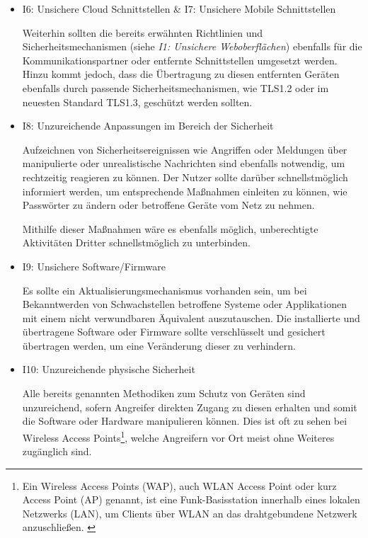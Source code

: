 \begin{itemize}
            \item I6: Unsichere Cloud Schnittstellen \& I7: Unsichere Mobile Schnittstellen
            
            Weiterhin sollten die bereits erwähnten Richtlinien und Sicherheitsmechanismen (siehe \emph{I1: Unsichere Weboberflächen}) ebenfalls für die Kommunikationspartner oder entfernte Schnittstellen umgesetzt werden. Hinzu kommt jedoch, dass die Übertragung zu diesen entfernten Geräten ebenfalls durch passende Sicherheitsmechanismen, wie TLS1.2 oder im neuesten Standard TLS1.3, geschützt werden sollten.
            
            \item I8: Unzureichende Anpassungen im Bereich der Sicherheit
            
            Aufzeichnen von Sicherheitsereignissen wie Angriffen oder Meldungen über manipulierte oder unrealistische Nachrichten sind ebenfalls notwendig, um rechtzeitig reagieren zu können. Der Nutzer sollte darüber schnellstmöglich informiert werden, um entsprechende Maßnahmen einleiten zu können, wie Passwörter zu ändern oder betroffene Geräte vom Netz zu nehmen.
            
            Mithilfe dieser Maßnahmen wäre es ebenfalls möglich, unberechtigte Aktivitäten Dritter schnellstmöglich zu unterbinden.
            
            \item I9: Unsichere Software/Firmware
            
            Es sollte ein Aktualisierungsmechanismus vorhanden sein, um bei Bekanntwerden von Schwachstellen betroffene Systeme oder Applikationen mit einem nicht verwundbaren Äquivalent auszutauschen. 
            Die installierte und übertragene Software oder Firmware sollte verschlüsselt und gesichert übertragen werden, um eine Veränderung dieser zu verhindern.
            
            \item I10: Unzureichende physische Sicherheit
            
            Alle bereits genannten Methodiken zum Schutz von Geräten sind unzureichend, sofern Angreifer direkten Zugang zu diesen erhalten und somit die Software oder Hardware manipulieren können. Dies ist oft zu sehen bei Wireless Access Points\footnote{\glqq Ein Wireless Access Points (WAP), auch WLAN Access Point oder kurz Access Point (AP) genannt, ist eine Funk-Basisstation innerhalb eines lokalen Netzwerks (LAN), um Clients über WLAN an das drahtgebundene Netzwerk anzuschließen.\grqq{} \cite{elektronik_kompendium_2018}}, welche Angreifern vor Ort meist ohne Weiteres zugänglich sind.
        \end{itemize}
        
